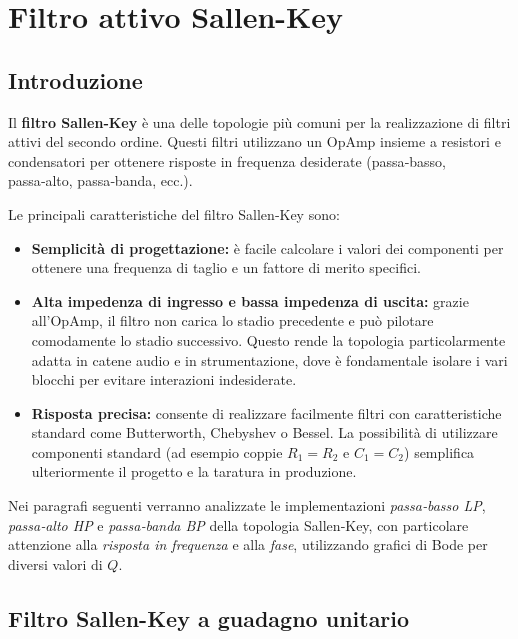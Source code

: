 \chapter{Filtro attivo Sallen-Key}
\section{Introduzione}

Il \textbf{filtro Sallen‑Key} è una delle topologie più comuni per la realizzazione di filtri attivi del secondo ordine.
Questi filtri utilizzano un OpAmp insieme a resistori e condensatori per ottenere
risposte in frequenza desiderate (passa‑basso, passa‑alto, passa‑banda, ecc.).

Le principali caratteristiche del filtro Sallen‑Key sono:

\begin{itemize}
    \item \textbf{Semplicità di progettazione:} è facile calcolare i valori dei componenti per ottenere una frequenza di taglio e un fattore di merito specifici.  

    \item \textbf{Alta impedenza di ingresso e bassa impedenza di uscita:} grazie all’OpAmp, il filtro non carica lo stadio precedente e può pilotare comodamente lo stadio successivo.  
          Questo rende la topologia particolarmente adatta in catene audio e in strumentazione, dove
          è fondamentale isolare i vari blocchi per evitare interazioni indesiderate.
    \item \textbf{Risposta precisa:} consente di realizzare facilmente filtri con caratteristiche standard come Butterworth, Chebyshev o Bessel.  
          La possibilità di utilizzare componenti standard (ad esempio coppie \(R_1 = R_2\) e \(C_1 = C_2\)) semplifica ulteriormente il progetto e la taratura in produzione.
\end{itemize}

Nei paragrafi seguenti verranno analizzate le implementazioni \emph{passa‑basso LP},
\emph{passa‑alto HP} e \emph{passa‑banda BP} della topologia Sallen‑Key,
con particolare attenzione alla \emph{risposta in frequenza} e alla \emph{fase}, utilizzando grafici di Bode per diversi valori di \(Q\).


\newpage
\section{Filtro Sallen-Key a guadagno unitario}


